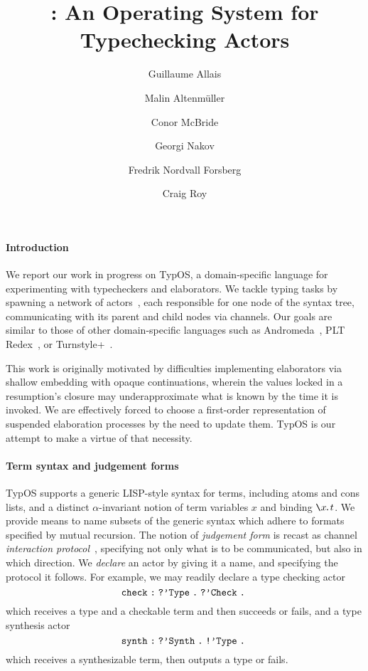 \documentclass{easychair}
\author{
  Guillaume Allais\inst{1}
  \and
  Malin Altenm\"uller\inst{2}
  \and
  Conor McBride\inst{2}
  \and
  Georgi Nakov\inst{2}
  \and
  Fredrik Nordvall Forsberg\inst{2}
  \and
  Craig Roy\inst{3}
}
\institute{
University of St Andrews,
Fife, United Kingdom
\and
University of Strathclyde,
Glasgow, United Kingdom
\and
Quantinuum \& Cambridge Quantum,
Cambridge, United Kingdom
}
\title{\TypOS: An Operating System for Typechecking Actors}
\newcommand{\TypOS}{TypOS\xspace}
\newcommand{\atom}[1]{\texttt{\symbol{39}}#1\;}
\newcommand{\bsl}{\texttt{\symbol{92}}}
\newcommand{\bind}[1]{\bsl #1\!\texttt{.}}
\newcommand{\hab}{\;\texttt{:}\;}
\newcommand{\bang}{\texttt{!}}
\newcommand{\query}{\texttt{?}}
\newcommand{\then}{\texttt{.}\;}
\begin{document}
\maketitle


\paragraph{Introduction}
We report our work in progress on \TypOS{}, a domain-specific language
for experimenting with typecheckers and elaborators. %
We tackle typing tasks by spawning a network of
actors~\cite{hewitt1973actors}, each responsible for one node of the
syntax tree, communicating with its parent and child
nodes via channels. Our goals are similar to those of other
domain-specific languages such as Andromeda~\cite{andromeda}, PLT
Redex~\cite{redex}, or Turnstyle+~\cite{turnstyleplus}.

This work is originally motivated by difficulties implementing
elaborators via shallow embedding with opaque continuations, wherein
the values locked in a resumption's closure may
underapproximate what is known by the time it is invoked.
We are effectively forced to choose a first-order representation of
suspended elaboration processes by the need to update them. \TypOS{}
is our attempt to make a virtue of that necessity.

\paragraph{Term syntax and judgement forms}
\TypOS{} supports a generic LISP-style syntax for terms, including atoms
and cons lists, and a
distinct $\alpha$-invariant notion of term variables $x$ and binding
$\bind x t$. We provide means to name subsets of the generic syntax
which adhere to formats specified by mutual recursion.  The notion of
\emph{judgement form} is recast as channel \emph{interaction
  protocol}~\cite{honda1993session}, specifying not only what is to be
communicated, but also in which direction.  We \emph{declare} an actor
by giving it a name, and specifying the protocol it follows. For
example, we may readily declare a type checking actor
\[
  \mathtt{check \hab \query\atom{Type}\then \query\atom{Check}\then}
\]
which receives a type and a checkable term and then succeeds or fails,
and a type synthesis actor
\[
  \mathtt{synth \hab \query\atom{Synth}\then \bang\atom{Type}\then}
\]
which receives a synthesizable term, then outputs a type or fails.
\end{document}
